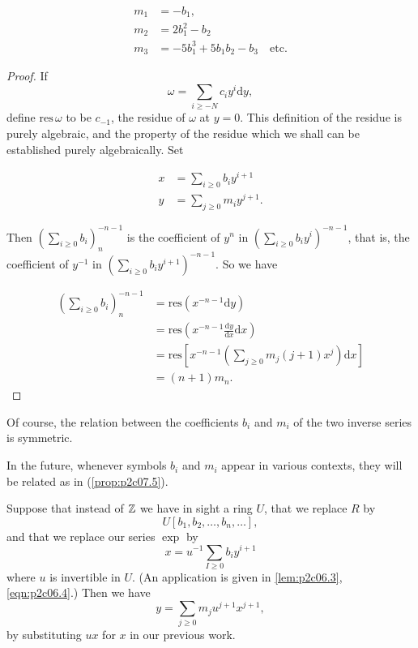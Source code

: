 \documentclass[../main]{subfiles}
\begin{document}
\begin{examples}
\begin{align*}
m_1 & = -b_1, \\ m_2 & = 2 b_1^2 - b_2 \\ m_3 & = -5b_1^3 + 5b_1b_2 - b_3 \quad \text{etc.}
\end{align*}
\end{examples}

\begin{proof}
If $$\omega = \sum_{i \ge -N} c_i y^i \mathrm d y,$$ define $\mathrm{res} \, \omega$ to be $c_{-1}$, the residue of $\omega$ at $y=0$. This definition of the residue is purely algebraic, and the property of the residue which we shall can be established purely algebraically. Set

\begin{align*}
x & = \sum_{i \ge 0} b_i y^{i + 1} \\ y & = \sum_{j \ge 0} m_i y^{j + 1}.
\end{align*}

Then $\displaystyle \left(\sum_{i \ge 0} b_i\right)_n^{-n - 1}$ is the coefficient of $y^n$ in $\displaystyle \left(\sum_{i \ge 0} b_i y^i\right)^{-n - 1}$, that is, the coefficient of $y^{-1}$ in $\displaystyle \left(\sum_{i \ge 0} b_i y^{i + 1}\right)^{-n - 1}$. So we have 

\begin{align*}
\left(\sum_{i \ge 0} b_i\right)_n^{-n - 1} & = \mathrm{res}(x^{-n - 1} \mathrm dy) \\ & = \mathrm{res} \left(x^{-n - 1} \frac {\mathrm dy} {\mathrm dx} \mathrm dx\right) \\ & = \mathrm{res} \left[x^{-n - 1} \left(\sum_{j \ge 0} m_j (j + 1) x^j\right) \mathrm dx\right] \\ & = (n + 1)m_n.
\end{align*}
\end{proof}

Of course, the relation between the coefficients $b_i$ and $m_i$ of the two inverse series is symmetric.

In the future, whenever symbols $b_i$ and $m_i$ appear in various contexts, they will be related as in (\ref{prop:p2c07.5}).

\begin{remark}
Suppose that instead of $\mathbb{Z}$ we have in sight a ring $U$, that we replace $R$ by $$U[b_1, b_2, \ldots, b_n, \ldots],$$ and that we replace our series $\exp$ by $$x = u^{-1} \sum_{I \ge 0} b_i y^{i + 1}$$ where $u$ is invertible in $U$. (An application is given in \eqref{lem:p2c06.3}, \eqref{eqn:p2c06.4}.) Then we have $$y = \sum_{j \ge 0} m_j u^{j + 1} x^{j + 1},$$ by substituting $u x$ for $x$ in our previous work.
\end{remark}
\end{document}

